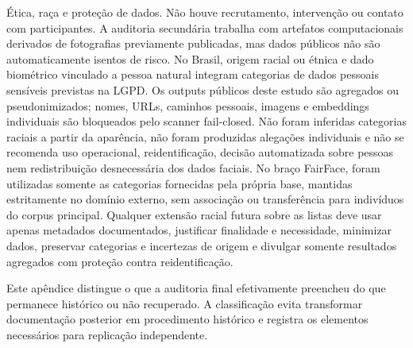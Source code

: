 \begin{declarations}
Ética, raça e proteção de dados. Não houve recrutamento, intervenção ou contato com participantes. A auditoria secundária trabalha com artefatos computacionais derivados de fotografias previamente publicadas, mas dados públicos não são automaticamente isentos de risco. No Brasil, origem racial ou étnica e dado biométrico vinculado a pessoa natural integram categorias de dados pessoais sensíveis previstas na LGPD. Os outputs públicos deste estudo são agregados ou pseudonimizados; nomes, URLs, caminhos pessoais, imagens e embeddings individuais são bloqueados pelo scanner fail-closed. Não foram inferidas categorias raciais a partir da aparência, não foram produzidas alegações individuais e não se recomenda uso operacional, reidentificação, decisão automatizada sobre pessoas nem redistribuição desnecessária dos dados faciais. No braço FairFace, foram utilizadas somente as categorias fornecidas pela própria base, mantidas estritamente no domínio externo, sem associação ou transferência para indivíduos do corpus principal. Qualquer extensão racial futura sobre as listas deve usar apenas metadados documentados, justificar finalidade e necessidade, minimizar dados, preservar categorias e incertezas de origem e divulgar somente resultados agregados com proteção contra reidentificação.

\end{declarations}

\nocite{*}
\begingroup
{}
\fontsize{10.5}{12.5}\selectfont
\setlength{\parindent}{0pt}
\RaggedRight

\endgroup


Este apêndice distingue o que a auditoria final efetivamente preencheu do que permanece histórico ou não recuperado. A classificação evita transformar documentação posterior em procedimento histórico e registra os elementos necessários para replicação independente.


